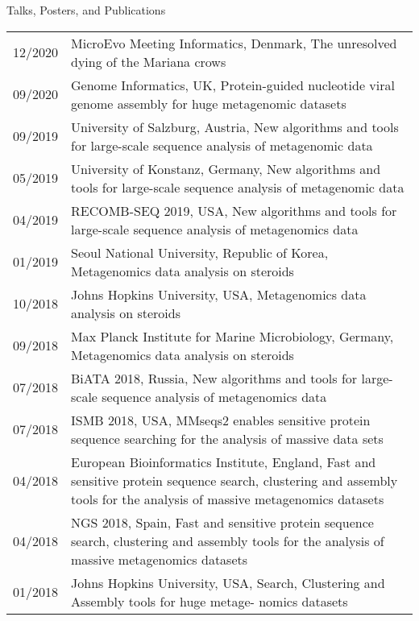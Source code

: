 \documentclass{resume} %
\begin{document}
\begin{rSection}{Talks, Posters, and Publications}
\begin{tabular}{p{2.5cm}p{14.1cm}}
\\[1.mm] 
12/2020 & MicroEvo Meeting Informatics, Denmark, The unresolved dying of the Mariana crows 
\\[1.mm] 
09/2020 & Genome Informatics, UK, Protein-guided nucleotide viral genome assembly for huge metagenomic datasets 
\\[1.mm] 
09/2019 & University of Salzburg, Austria, New algorithms and tools for large-scale sequence analysis of metagenomic data
\\[1.mm] 
05/2019 & University of Konstanz, Germany, New algorithms and tools for large-scale sequence analysis of metagenomic data
\\[1.mm] 
04/2019 & RECOMB-SEQ 2019, USA, New algorithms and tools for large-scale sequence analysis of metagenomics data
\\[1.mm] 
01/2019 & Seoul National University, Republic of Korea, Metagenomics data analysis on steroids
\\[1.mm] 
10/2018 & Johns Hopkins University, USA, Metagenomics data analysis on steroids
\\[1.mm] 
09/2018 & Max Planck Institute for Marine Microbiology, Germany, Metagenomics data analysis on steroids
\\[1.mm] 
07/2018 & BiATA 2018, Russia, New algorithms and tools for large-scale sequence analysis of metagenomics data
\\[1.mm] 
07/2018 & ISMB 2018, USA, MMseqs2 enables sensitive protein sequence searching for the analysis of massive data sets
\\[1.mm] 
04/2018 & European Bioinformatics Institute, England, Fast and sensitive protein sequence search, clustering and assembly tools for the analysis of massive metagenomics datasets
\\[1.mm] 
04/2018 & NGS 2018, Spain, Fast and sensitive protein sequence search, clustering and assembly tools for the analysis of massive metagenomics datasets
\\[1.mm]
01/2018 & Johns Hopkins University, USA, Search, Clustering and Assembly tools for huge metage- nomics datasets
\\[1.mm]
\end{tabular}
\begin{tabular}{p{2.5cm}p{14.1cm}}


\end{tabular}
\end{rSection}
\end{document}
